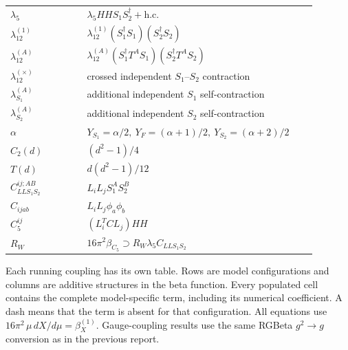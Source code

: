 \documentclass[8pt]{article}
\begin{document}
\begin{landscape}
\begin{longtable}{@{}p{0.23\linewidth}p{0.69\linewidth}@{}}
$\lambda_5$ & $\lambda_5HHS_1S_2^\dagger+\mathrm{h.c.}$ \\
$\lambda_{12}^{(1)}$ & $\lambda_{12}^{(1)}(S_1^\dagger S_1)(S_2^\dagger S_2)$ \\
$\lambda_{12}^{(A)}$ & $\lambda_{12}^{(A)}(S_1^\dagger T^AS_1)(S_2^\dagger T^AS_2)$ \\
$\lambda_{12}^{(\times)}$ & crossed independent $S_1$--$S_2$ contraction \\
$\lambda_{S_1}^{(A)}$ & additional independent $S_1$ self-contraction \\
$\lambda_{S_2}^{(A)}$ & additional independent $S_2$ self-contraction \\
$\alpha$ & $Y_{S_1}=\alpha/2,\ Y_F=(\alpha+1)/2,\ Y_{S_2}=(\alpha+2)/2$ \\
$C_2(d)$ & $(d^2-1)/4$ \\
$T(d)$ & $d(d^2-1)/12$ \\
$C_{LLS_1S_2}^{ij;AB}$ & $L_iL_jS_1^AS_2^B$ \\
$C_{ijab}$ & $L_iL_j\phi_a\phi_b$ \\
$C_5^{ij}$ & $(L_i^TCL_j)HH$ \\
$R_W$ & $16\pi^2\beta_{C_5}\supset R_W\lambda_5C_{LLS_1S_2}$ \\
\bottomrule
\end{longtable}
Each running coupling has its own table. Rows are model configurations and columns are additive structures in the beta function. Every populated cell contains the complete model-specific term, including its numerical coefficient. A dash means that the term is absent for that configuration.
\medskip
All equations use $16\pi^2\,\mu\,dX/d\mu=\beta_X^{(1)}$. Gauge-coupling results use the same RGBeta $g^2\rightarrow g$ conversion as in the previous report.

\end{landscape}
\end{document}

